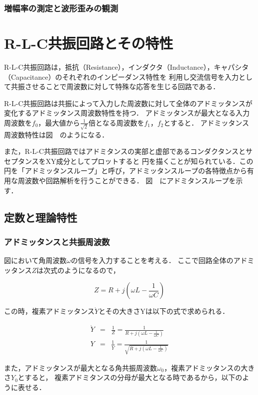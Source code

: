 \documentclass[dvipdfmx,titlepage,a4j]{jsarticle}  %
\numberwithin{equation}{section}
\begin{document}
\subsubsection{増幅率の測定と波形歪みの観測}

\section{R-L-C共振回路とその特性}
R-L-C共振回路は，抵抗（Resistance），インダクタ（Inductance），キャパシタ（Capacitance）のそれぞれのインピーダンス特性を
利用し交流信号を入力として共振させることで周波数に対して特殊な応答を生じる回路である．

R-L-C共振回路は共振によって入力した周波数に対して全体のアドミッタンスが変化するアドミッタンス周波数特性を持つ．
アドミッタンスが最大となる入力周波数を$f_0$，最大値から$\frac{1}{\sqrt{2}}$倍となる周波数を$f_1$，$f_2$とすると．
アドミッタンス周波数特性は図　のようになる．

また，R-L-C共振回路ではアドミタンスの実部と虚部であるコンダクタンスとサセプタンスをXY成分としてプロットすると
円を描くことが知られている．この円を「アドミッタンスループ」と呼び，アドミッタンスループの各特徴点から有用な周波数や回路解析を行うことができる．
図　にアドミタンスループを示す．

\subsection{定数と理論特性}

\subsubsection{アドミッタンスと共振周波数}
図において角周波数$\omega$の信号を入力することを考える．
ここで回路全体のアドミッタンス$Z$は次式のようになるので，

\begin{equation}
  Z = R + j(\omega L - \frac{1}{\omega C})
\end{equation}

この時，複素アドミッタンス$\dot{Y}$とその大きさYは以下の式で求められる．

\begin{eqnarray}
  \dot{Y} &=& \frac{1}{Z} = \frac{1}{R + j(\omega L - \frac{1}{\omega C})} \\
  Y &=& \frac{1}{\dot{Y}} = \frac{1}{\sqrt{R + j(\omega L - \frac{1}{\omega C})}}
\end{eqnarray}

また，アドミッタンスが最大となる角共振周波数$\omega_0$，複素アドミッタンスの大きさ$Y_0$とすると，
複素アドミタンスの分母が最大となる時であるから，以下のように表せる．
\end{document}
